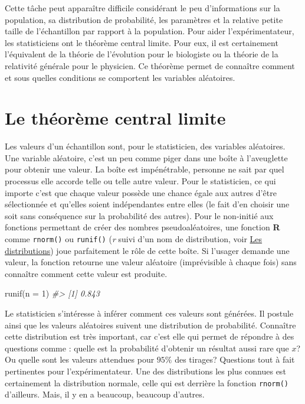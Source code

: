 \documentclass[
]{book}
\newenvironment{Shaded}{}{}
\newcommand{\AttributeTok}[1]{#1}
\newcommand{\CommentTok}[1]{\textit{#1}}
\newcommand{\DecValTok}[1]{#1}
\newcommand{\FunctionTok}[1]{#1}
\newcommand{\NormalTok}[1]{#1}
\begin{document}
Cette tâche peut apparaître difficile considérant le peu d'informations sur la population, sa distribution de probabilité, les paramètres et la relative petite taille de l'échantillon par rapport à la population. Pour aider l'expérimentateur, les statisticiens ont le théorème central limite. Pour eux, il est certainement l'équivalent de la théorie de l'évolution pour le biologiste ou la théorie de la relativité générale pour le physicien. Ce théorème permet de connaître comment et sous quelles conditions se comportent les variables aléatoires.

\hypertarget{le-thuxe9oruxe8me-central-limite}{%
\section{Le théorème central limite}\label{le-thuxe9oruxe8me-central-limite}}

Les valeurs d'un échantillon sont, pour le statisticien, des variables aléatoires. Une variable aléatoire, c'est un peu comme piger dans une boîte à l'aveuglette pour obtenir une valeur. La boîte est impénétrable, personne ne sait par quel processus elle accorde telle ou telle autre valeur. Pour le statisticien, ce qui importe c'est que chaque valeur possède une chance égale aux autres d'être sélectionnée et qu'elles soient indépendantes entre elles (le fait d'en choisir une soit sans conséquence sur la probabilité des autres). Pour le non-initié aux fonctions permettant de créer des nombres pseudoaléatoires, une fonction \textbf{R} comme \texttt{rnorm()} ou \texttt{runif()} (\emph{r} suivi d'un nom de distribution, voir \protect\hyperlink{les-distributions}{Les distributions}) joue parfaitement le rôle de cette boîte. Si l'usager demande une valeur, la fonction retourne une valeur aléatoire (imprévisible à chaque fois) sans connaître comment cette valeur est produite.

\begin{Shaded}
\begin{Highlighting}[]
\FunctionTok{runif}\NormalTok{(}\AttributeTok{n =} \DecValTok{1}\NormalTok{)}
\CommentTok{\#\textgreater{} [1] 0.843}
\end{Highlighting}
\end{Shaded}

Le statisticien s'intéresse à inférer comment ces valeurs sont générées. Il postule ainsi que les valeurs aléatoires suivent une distribution de probabilité. Connaître cette distribution est très important, car c'est elle qui permet de répondre à des questions comme : quelle est la probabilité d'obtenir un résultat aussi rare que \(x\)? Ou quelle sont les valeurs attendues pour \(95\%\) des tirages? Questions tout à fait pertinentes pour l'expérimentateur. Une des distributions les plus connues est certainement la distribution normale, celle qui est derrière la fonction \texttt{rnorm()} d'ailleurs. Mais, il y en a beaucoup, beaucoup d'autres.
\end{document}
